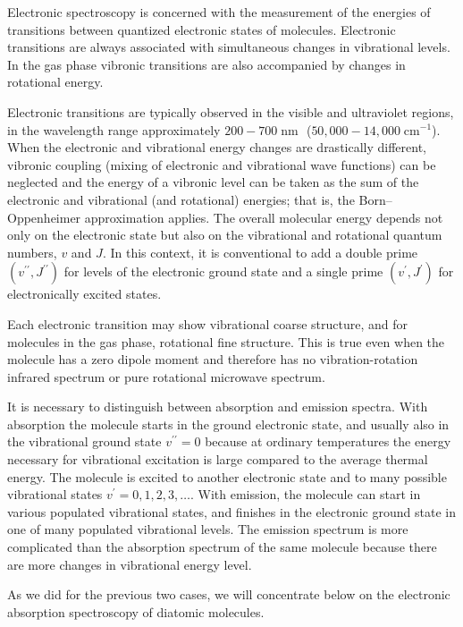 \documentclass[
  9pt,
]{extbook}
\theoremstyle{definition}
\theoremstyle{definition}
\theoremstyle{definition}
\theoremstyle{remark}
\begin{document}
Electronic spectroscopy is concerned with the measurement of the energies of transitions between quantized electronic states of molecules. Electronic transitions are always associated with simultaneous changes in vibrational levels. In the gas phase vibronic transitions are also accompanied by changes in rotational energy.

Electronic transitions are typically observed in the visible and ultraviolet regions, in the wavelength range approximately \(200-700\; \text{nm }\) (\(50,000-14,000\; \text{cm}^{-1}\)). When the electronic and vibrational energy changes are drastically different, vibronic coupling (mixing of electronic and vibrational wave functions) can be neglected and the energy of a vibronic level can be taken as the sum of the electronic and vibrational (and rotational) energies; that is, the Born--Oppenheimer approximation applies. The overall molecular energy depends not only on the electronic state but also on the vibrational and rotational quantum numbers, \(v\) and \(J\). In this context, it is conventional to add a double prime \(\left(v^{\prime\prime},J^{\prime\prime}\right)\) for levels of the electronic ground state and a single prime \(\left(v^{\prime},J^{\prime}\right)\) for electronically excited states.

Each electronic transition may show vibrational coarse structure, and for molecules in the gas phase, rotational fine structure. This is true even when the molecule has a zero dipole moment and therefore has no vibration-rotation infrared spectrum or pure rotational microwave spectrum.

It is necessary to distinguish between absorption and emission spectra. With absorption the molecule starts in the ground electronic state, and usually also in the vibrational ground state \(v^{\prime\prime}=0\) because at ordinary temperatures the energy necessary for vibrational excitation is large compared to the average thermal energy. The molecule is excited to another electronic state and to many possible vibrational states \(v^{\prime}=0,1,2,3,\ldots\). With emission, the molecule can start in various populated vibrational states, and finishes in the electronic ground state in one of many populated vibrational levels. The emission spectrum is more complicated than the absorption spectrum of the same molecule because there are more changes in vibrational energy level.

As we did for the previous two cases, we will concentrate below on the electronic absorption spectroscopy of diatomic molecules.
\end{document}
